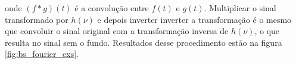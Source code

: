 \documentclass[a4paper,12pt,oneside]{book}
\DeclareMathOperator{\sinc}{sinc}
\DeclareMathOperator{\rect}{rect}
\begin{document}
\par onde $(f * g)(t)$ é a convolução entre $f(t)$ e $g(t)$. Multiplicar o sinal transformado por $h(\nu)$ e depois inverter inverter a transformação é o mesmo que convoluir o sinal original com a transformação inversa de $h(\nu)$, o que resulta no sinal sem o fundo\cite{josh_bradt, GET}. Resultados desse procedimento estão na figura \ref{fig:bs_fourier_exs}.


%
\end{document}
